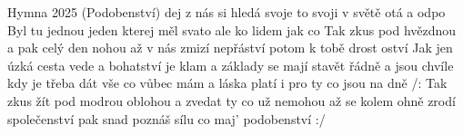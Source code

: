 \begin{TEXT}{Hymna 2025 (Podobenství)}
\SLOKA {}dej z nás si hledá svoje to svoji \NL
v světě  otá a odpo\NL
Byl tu jednou jeden kterej měl svato\NL
ale ko lidem   jak co  
\SLOKA[Ref. A:]  Tak zkus  pod hvězdnou \NL
a  pak celý den nohou\NL
až v nás  zmizí  nepřáství\NL
{}potom  k tobě drost oství\NL
\SLOKA Jak jen úzká cesta vede a bohatství je klam\NL
a základy se mají stavět řádně\NL
a jsou chvíle kdy je třeba dát vše co vůbec mám\NL
a láska platí i pro ty co jsou na dně\NL
\SLOKA[Ref. B:] /: Tak zkus žít pod modrou oblohou\NL
a zvedat ty co už nemohou\NL
až se kolem ohně zrodí společenství\NL
pak snad poznáš sílu co maj' podobenství :/ \NL
\end{TEXT}
